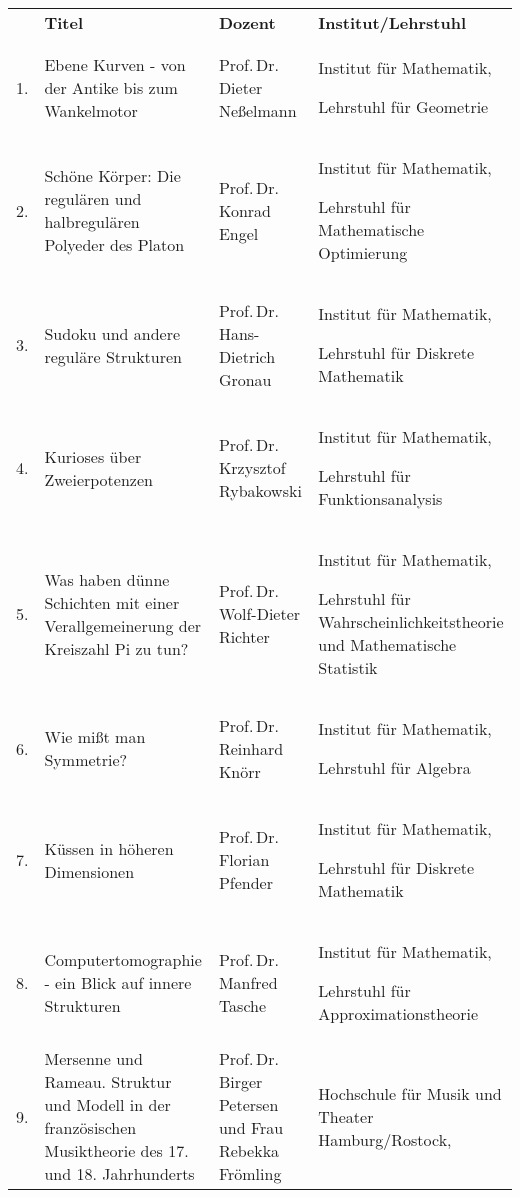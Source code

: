 \begin{longtable}{rXp{5cm}p{4cm}}
   & \centering\textbf{Titel} & \centering\textbf{Dozent} &
  \textbf{Institut/Lehrstuhl}\\
  1. & Ebene Kurven - von der Antike bis zum Wankelmotor & Prof.\,Dr. Dieter
  Neßelmann & Institut für Mathematik,

  Lehrstuhl für Geometrie\\

  2. & Schöne Körper: Die regulären und halbregulären Polyeder des Platon &
  Prof.\,Dr. Konrad Engel & Institut für Mathematik,

  Lehrstuhl für Mathematische Optimierung\\

  3. & Sudoku und andere reguläre Strukturen & Prof.\,Dr. Hans-Dietrich Gronau
     & Institut für Mathematik,

  Lehrstuhl für Diskrete Mathematik\\

  4. & Kurioses über Zweierpotenzen & Prof.\,Dr. Krzysztof Rybakowski &
  Institut für Mathematik,

  Lehrstuhl für Funktionsanalysis\\

  5. & Was haben dünne Schichten mit einer Verallgemeinerung der Kreiszahl Pi
  zu tun? & Prof.\,Dr. Wolf-Dieter Richter & Institut für Mathematik,

  Lehrstuhl für Wahrscheinlichkeitstheorie und Mathematische Statistik\\

  6. & Wie mißt man Symmetrie? & Prof.\,Dr. Reinhard Knörr & Institut für
  Mathematik,

  Lehrstuhl für Algebra\\

  7. & Küssen in höheren Dimensionen & Prof.\,Dr. Florian Pfender & Institut
  für Mathematik,

  Lehrstuhl für Diskrete Mathematik\\

  8. & Computertomographie - ein Blick auf innere Strukturen & Prof.\,Dr.
  Manfred Tasche & Institut für Mathematik,

  Lehrstuhl für Approximationstheorie\\

  9. & Mersenne und Rameau. Struktur und Modell in der französischen
  Musiktheorie des 17. und 18. Jahrhunderts & Prof.\,Dr. Birger Petersen und
  Frau Rebekka Frömling & Hochschule für Musik und Theater Hamburg/Rostock,


\end{longtable}
